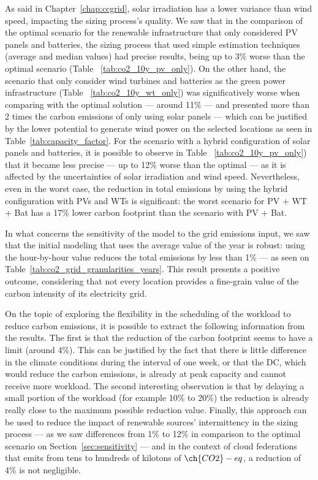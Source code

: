 
As said in Chapter~\ref{chap:ccgrid}, solar irradiation has a lower variance than wind speed, impacting the sizing process's quality. We saw that in the comparison of the optimal scenario for the renewable infrastructure that only considered PV panels and batteries, the sizing process that used simple estimation techniques (average and median values) had precise results, being up to 3\% worse than the optimal scenario (Table ~\ref{tab:co2_10y_pv_only}). On the other hand, the scenario that only consider wind turbines and batteries as the green power infrastructure (Table ~\ref{tab:co2_10y_wt_only}) was significatively worse when comparing with the optimal solution ---  around 11\% --- and presented more than 2 times the carbon emissions of only using solar panels --- which can be justified by the lower potential to generate wind power on the selected locations as seen in Table~\ref{tab:capacity_factor}. For the scenario with a hybrid configuration of solar panels and batteries, it is possible to observe in Table ~\ref{tab:co2_10y_pv_only}) that it became less precise --- up to 12\% worse than the optimal --- as it is affected by the uncertainties of solar irradiation and wind speed. Nevertheless, even in the worst case, the reduction in total  emissions by using the hybrid configuration with PVs and WTs is significant: the worst scenario for PV + WT + Bat has a 17\% lower carbon footprint than the scenario with PV + Bat.


In what concerns the sensitivity of the model to the grid emissions input, we saw that the initial modeling that uses the average value of the year is robust: using the hour-by-hour value reduces the total  emissions by less than 1\% --- as seen on Table~\ref{tab:co2_grid_granularities_years}. This result presents a positive outcome, considering that not every location provides a fine-grain value of the carbon intensity of its electricity grid.


On the topic of exploring the flexibility in the scheduling of the workload to reduce carbon emissions, it is possible to extract the following information from the results. The first is that the reduction of the carbon footprint seems to have a limit (around 4\%). This can be justified by the fact that there is little difference in the climate conditions during the interval of one week, or that the DC, which would reduce the carbon emissions, is already at peak capacity and cannot receive more workload. The second interesting observation is that by delaying a small portion of the workload (for example 10\% to 20\%)  the reduction is already really close to the maximum possible reduction value. Finally, this approach can be used to reduce the impact of renewable sources' intermittency in the sizing process --- as we saw differences from 1\% to 12\% in comparison to the optimal scenario on Section~\ref{sec:sensitivity} --- and in the context of cloud federations that emits from tens to hundreds of kilotons of $\ch{CO2}-eq$, a reduction of 4\% is not negligible.

